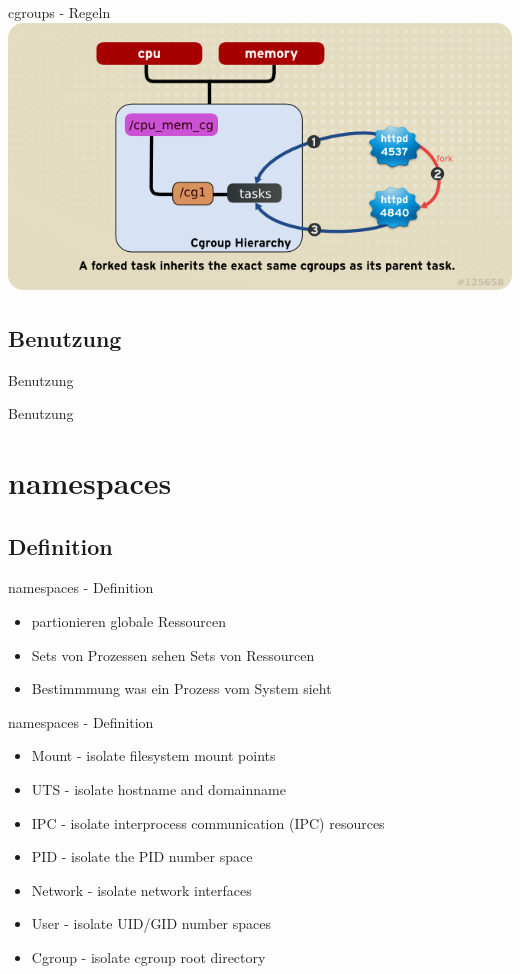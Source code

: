 \documentclass[14pt]{beamer}
\begin{document}
    \begin{frame}{cgroups - Regeln}
    \centering\includegraphics[scale=0.7]{logo/RMG-rule4}
    \end{frame}
    \subsection{Benutzung}
    \begin{frame}{Benutzung}
    
    \end{frame}
    \begin{frame}{Benutzung}
    
    \end{frame}
    
    \section{namespaces}
    \subsection{Definition}
    \begin{frame}{namespaces - Definition}
    \begin{itemize}
    \item partionieren globale Ressourcen
    \item Sets von Prozessen sehen Sets von Ressourcen
    \item Bestimmmung was ein Prozess vom System sieht
    \end{itemize}
    
    \end{frame}
    \begin{frame}{namespaces - Definition}
    \begin{itemize}
    \item Mount - isolate filesystem mount points
	\item UTS - isolate hostname and domainname
	\item IPC - isolate interprocess communication (IPC) resources
	\item PID - isolate the PID number space
	\item Network - isolate network interfaces
	\item User - isolate UID/GID number spaces
  	\item Cgroup - isolate cgroup root directory
    \end{itemize}
    \end{frame}
    
\end{document}
